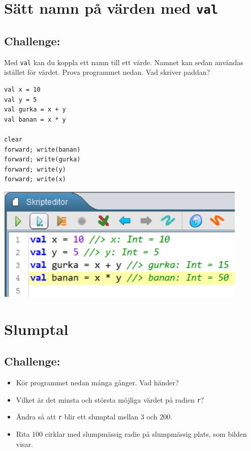 \chapter{Sätt namn på värden med \lstinline{val}}
\begin{multicols}{2}
\section*{\color{BrickRed}Challenge:}
Med \lstinline{val} kan du koppla ett namn till ett värde. Namnet kan sedan användas istället för värdet. Prova programmet nedan. Vad skriver paddan?

\begin{lstlisting}[numbers=none]
val x = 10
val y = 5
val gurka = x + y
val banan = x * y

clear
forward; write(banan)
forward; write(gurka)
forward; write(y)
forward; write(x)
\end{lstlisting}
        

\columnbreak

\begin{center}
\includegraphics[width=12.0cm]{../img/val.png}
\end{center}

\end{multicols}

\chapter{Slumptal}\section*{\color{BrickRed}Challenge:}


\begin{itemize}

\item {Kör programmet nedan många gånger. Vad händer?}
\item {Vilket är det minsta och största möjliga värdet på radien \lstinline{r}?}
\item {Ändra så att \lstinline{r} blir ett slumptal mellan 3 och 200.}
\item {Rita 100 cirklar med slumpmässig radie på slumpmässig plats, som bilden visar.}

\end{itemize}



